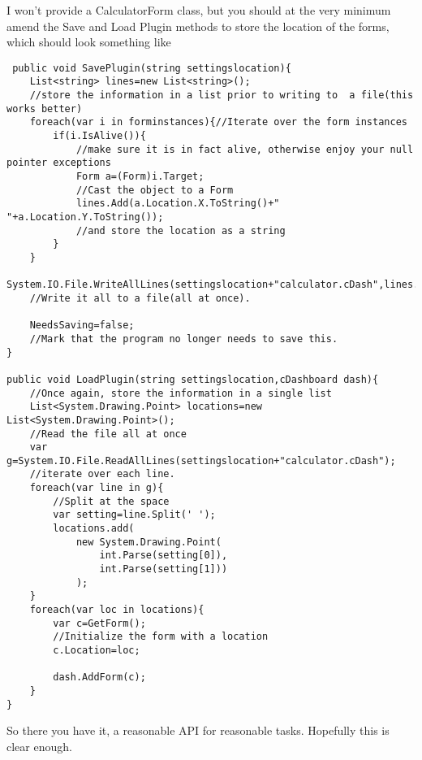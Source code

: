\documentclass{article}
\begin{document}
 I won't provide a CalculatorForm class, but you should at the very minimum amend the Save and Load Plugin methods to store the location of the forms, which should look something like
 
 \begin{lstlisting}
 public void SavePlugin(string settingslocation){
	List<string> lines=new List<string>();
 	//store the information in a list prior to writing to  a file(this works better)
	foreach(var i in forminstances){//Iterate over the form instances
		if(i.IsAlive()){
			//make sure it is in fact alive, otherwise enjoy your null pointer exceptions
			Form a=(Form)i.Target;
			//Cast the object to a Form
			lines.Add(a.Location.X.ToString()+" "+a.Location.Y.ToString());
			//and store the location as a string
		}
	}
	System.IO.File.WriteAllLines(settingslocation+"calculator.cDash",lines.ToArray());
	//Write it all to a file(all at once).
	
	NeedsSaving=false;
	//Mark that the program no longer needs to save this.
}

public void LoadPlugin(string settingslocation,cDashboard dash){
	//Once again, store the information in a single list
	List<System.Drawing.Point> locations=new List<System.Drawing.Point>();
	//Read the file all at once
	var g=System.IO.File.ReadAllLines(settingslocation+"calculator.cDash");
	//iterate over each line.
	foreach(var line in g){
		//Split at the space
		var setting=line.Split(' ');
		locations.add(
			new System.Drawing.Point(
				int.Parse(setting[0]),
				int.Parse(setting[1]))
			);
	}
	foreach(var loc in locations){
		var c=GetForm();
		//Initialize the form with a location
		c.Location=loc;
		
		dash.AddForm(c);
	}
}
 \end{lstlisting}

So there you have it, a reasonable API for reasonable tasks. Hopefully this is clear enough.
\end{document}
